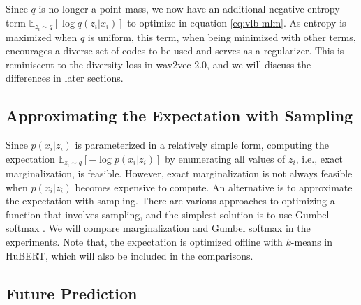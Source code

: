 Since $q$ is no longer a point mass, we now have an additional negative entropy term $\mathbb{E}_{z_i \sim q}[\log q(z_i | x_i)]$ to optimize in equation \ref{eq:vlb-mlm}.
As entropy is maximized when $q$ is uniform, this term, when being minimized with other terms, encourages a diverse set of codes to be used and serves as a regularizer.
This is reminiscent to the diversity loss in wav2vec 2.0, and we will discuss the differences in later sections.

\subsection{Approximating the Expectation with Sampling}

Since $p(x_i | z_i)$ is parameterized in a relatively simple form, computing the expectation $\mathbb{E}_{z_i \sim q}[-\log p(x_i | z_i)]$ by enumerating all values of $z_i$, i.e., exact marginalization, is feasible.
However, exact marginalization is not always feasible when $p(x_i | z_i)$ becomes expensive to compute.
An alternative is to approximate the expectation with sampling.
There are various approaches to optimizing a function that involves sampling, and the simplest solution is to use Gumbel softmax \citep{jang2016categorical}.
We will compare marginalization and Gumbel softmax in the experiments.
Note that, the expectation is optimized offline with $k$-means in HuBERT, which will also be included in the comparisons.

\subsection{Future Prediction}
\label{sec:futurepred}

